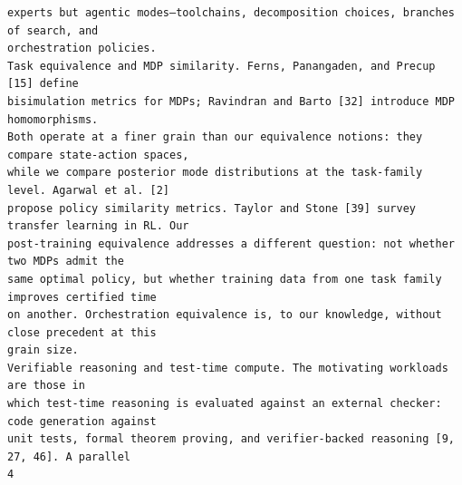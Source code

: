 \documentclass[11pt]{article}
\begin{document}
\begin{verbatim}
experts but agentic modes—toolchains, decomposition choices, branches of search, and
orchestration policies.
Task equivalence and MDP similarity. Ferns, Panangaden, and Precup [15] define
bisimulation metrics for MDPs; Ravindran and Barto [32] introduce MDP homomorphisms.
Both operate at a finer grain than our equivalence notions: they compare state-action spaces,
while we compare posterior mode distributions at the task-family level. Agarwal et al. [2]
propose policy similarity metrics. Taylor and Stone [39] survey transfer learning in RL. Our
post-training equivalence addresses a different question: not whether two MDPs admit the
same optimal policy, but whether training data from one task family improves certified time
on another. Orchestration equivalence is, to our knowledge, without close precedent at this
grain size.
Verifiable reasoning and test-time compute. The motivating workloads are those in
which test-time reasoning is evaluated against an external checker: code generation against
unit tests, formal theorem proving, and verifier-backed reasoning [9, 27, 46]. A parallel
4
\end{verbatim}

\clearpage
\end{document}
